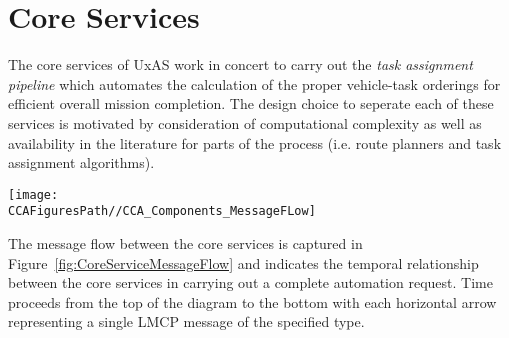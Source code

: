 \section{Core Services}\label{core-services}

The core services of UxAS work in concert to carry out the \emph{task assignment pipeline}
which automates the calculation of the proper vehicle-task orderings for efficient overall
mission completion. The design choice to seperate each of these services is motivated by
consideration of computational complexity as well as availability in the literature for
parts of the process (i.e. route planners and task assignment algorithms).

\begin{figure*}
	\texttt{[image: \\CCAFiguresPath//CCA\_Components\_MessageFLow]}
	\caption{Message Flow for Task Assignment Pipeline}
	\label{fig:CoreServiceMessageFlow}
\end{figure*}

The message flow between the core services is captured in Figure~\ref{fig:CoreServiceMessageFlow}
and indicates the temporal relationship between the core services in carrying out a complete
automation request. Time proceeds from the top of the diagram to the bottom with
each horizontal arrow representing a single LMCP message of the specified type.

